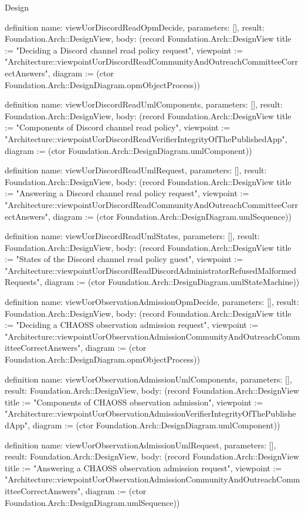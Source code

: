 \begin{lexlean}{Design}
\begin{semanticmodule}
definition{
  name: viewUorDiscordReadOpmDecide,
  parameters: [],
  result: Foundation.Arch::DesignView,
  body: (record Foundation.Arch::DesignView {title := "Deciding a Discord channel read policy request", viewpoint := "Architecture::viewpointUorDiscordReadCommunityAndOutreachCommitteeCorrectAnswers", diagram := (ctor Foundation.Arch::DesignDiagram.opmObjectProcess)})
}

definition{
  name: viewUorDiscordReadUmlComponents,
  parameters: [],
  result: Foundation.Arch::DesignView,
  body: (record Foundation.Arch::DesignView {title := "Components of Discord channel read policy", viewpoint := "Architecture::viewpointUorDiscordReadVerifierIntegrityOfThePublishedApp", diagram := (ctor Foundation.Arch::DesignDiagram.umlComponent)})
}

definition{
  name: viewUorDiscordReadUmlRequest,
  parameters: [],
  result: Foundation.Arch::DesignView,
  body: (record Foundation.Arch::DesignView {title := "Answering a Discord channel read policy request", viewpoint := "Architecture::viewpointUorDiscordReadCommunityAndOutreachCommitteeCorrectAnswers", diagram := (ctor Foundation.Arch::DesignDiagram.umlSequence)})
}

definition{
  name: viewUorDiscordReadUmlStates,
  parameters: [],
  result: Foundation.Arch::DesignView,
  body: (record Foundation.Arch::DesignView {title := "States of the Discord channel read policy guest", viewpoint := "Architecture::viewpointUorDiscordReadDiscordAdministratorRefusedMalformedRequests", diagram := (ctor Foundation.Arch::DesignDiagram.umlStateMachine)})
}

definition{
  name: viewUorObservationAdmissionOpmDecide,
  parameters: [],
  result: Foundation.Arch::DesignView,
  body: (record Foundation.Arch::DesignView {title := "Deciding a CHAOSS observation admission request", viewpoint := "Architecture::viewpointUorObservationAdmissionCommunityAndOutreachCommitteeCorrectAnswers", diagram := (ctor Foundation.Arch::DesignDiagram.opmObjectProcess)})
}

definition{
  name: viewUorObservationAdmissionUmlComponents,
  parameters: [],
  result: Foundation.Arch::DesignView,
  body: (record Foundation.Arch::DesignView {title := "Components of CHAOSS observation admission", viewpoint := "Architecture::viewpointUorObservationAdmissionVerifierIntegrityOfThePublishedApp", diagram := (ctor Foundation.Arch::DesignDiagram.umlComponent)})
}

definition{
  name: viewUorObservationAdmissionUmlRequest,
  parameters: [],
  result: Foundation.Arch::DesignView,
  body: (record Foundation.Arch::DesignView {title := "Answering a CHAOSS observation admission request", viewpoint := "Architecture::viewpointUorObservationAdmissionCommunityAndOutreachCommitteeCorrectAnswers", diagram := (ctor Foundation.Arch::DesignDiagram.umlSequence)})
}


\end{semanticmodule}
\end{lexlean}

